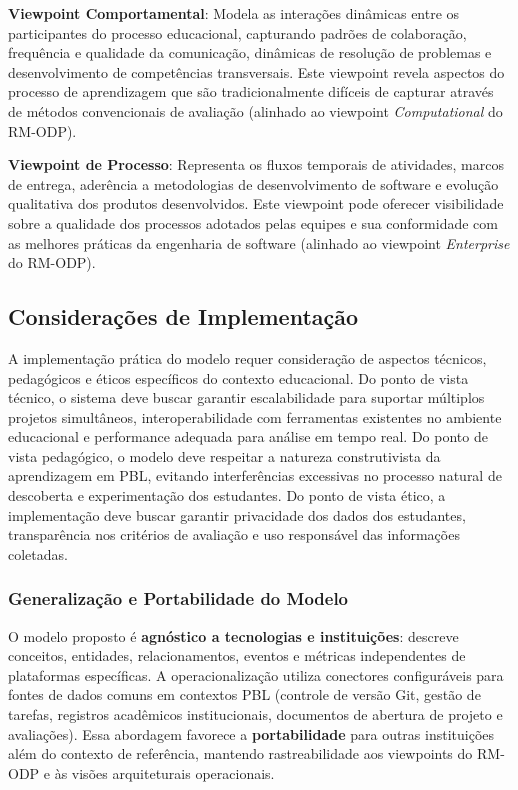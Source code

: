 \documentclass[12pt,a4paper]{article}
\begin{document}
\textbf{Viewpoint Comportamental}: Modela as interações dinâmicas entre os participantes do processo educacional, capturando padrões de colaboração, frequência e qualidade da comunicação, dinâmicas de resolução de problemas e desenvolvimento de competências transversais. Este viewpoint revela aspectos do processo de aprendizagem que são tradicionalmente difíceis de capturar através de métodos convencionais de avaliação (alinhado ao viewpoint \textit{Computational} do RM-ODP).

\textbf{Viewpoint de Processo}: Representa os fluxos temporais de atividades, marcos de entrega, aderência a metodologias de desenvolvimento de software e evolução qualitativa dos produtos desenvolvidos. Este viewpoint pode oferecer visibilidade sobre a qualidade dos processos adotados pelas equipes e sua conformidade com as melhores práticas da engenharia de software (alinhado ao viewpoint \textit{Enterprise} do RM-ODP).

\subsection{Considerações de Implementação}

A implementação prática do modelo requer consideração de aspectos técnicos,
pedagógicos e éticos específicos do contexto educacional. Do ponto de vista
técnico, o sistema deve buscar garantir escalabilidade para suportar múltiplos
projetos simultâneos, interoperabilidade com ferramentas existentes no ambiente
educacional e performance adequada para análise em tempo real. Do ponto de
vista pedagógico, o modelo deve respeitar a natureza construtivista da
aprendizagem em PBL, evitando interferências excessivas no processo natural de
descoberta e experimentação dos estudantes. Do ponto de vista ético, a
implementação deve buscar garantir privacidade dos dados dos estudantes,
transparência nos critérios de avaliação e uso responsável das informações
coletadas.

\subsubsection{Generalização e Portabilidade do Modelo}

O modelo proposto é \textbf{agnóstico a tecnologias e instituições}: descreve
conceitos, entidades, relacionamentos, eventos e métricas independentes de
plataformas específicas. A operacionalização utiliza conectores configuráveis
para fontes de dados comuns em contextos PBL (controle de versão Git, gestão de
tarefas, registros acadêmicos institucionais, documentos de abertura de projeto
e avaliações). Essa abordagem favorece a \textbf{portabilidade} para outras
instituições além do contexto de referência, mantendo rastreabilidade aos
viewpoints do RM-ODP e às visões arquiteturais operacionais.
\end{document}
